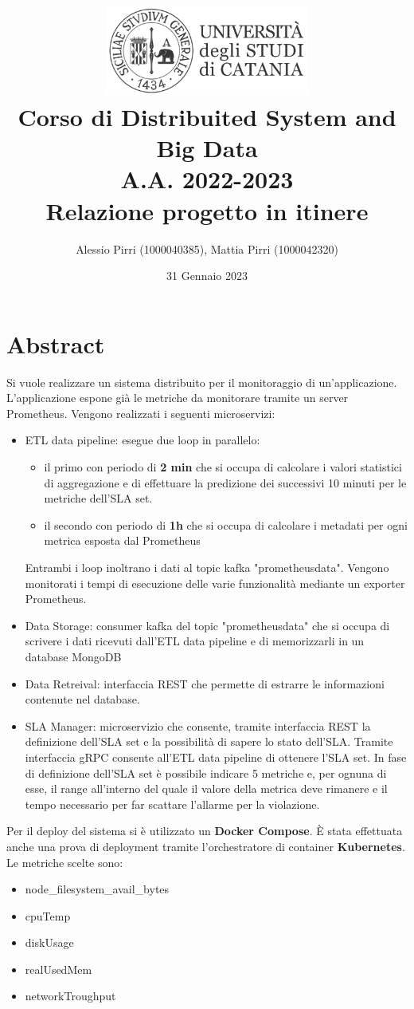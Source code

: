 \documentclass{article}
\title{
    \includegraphics[width=0.5\textwidth]{img/unict-universita-di-catania.png}\\
    \bigskip
    \LARGE Corso di Distribuited System and Big Data\\
    A.A. 2022-2023\\
    \Huge Relazione progetto in itinere\\
    \bigskip
    \Large 
}
\author{Alessio Pirri (1000040385), Mattia Pirri (1000042320)}
\date{31 Gennaio 2023}
\begin{document}
\maketitle
\newpage
\tableofcontents
\newpage

\section{Abstract}
Si vuole realizzare un sistema distribuito per il monitoraggio di un'applicazione. L'applicazione espone già le metriche da monitorare tramite un server Prometheus. Vengono realizzati i seguenti microservizi: 
\begin{itemize}
    \item ETL data pipeline: esegue due loop in parallelo: 
        \begin{itemize}
            
            \item il primo con periodo di \textbf{2 min} che si occupa di calcolare i valori statistici di aggregazione e di effettuare la predizione dei successivi 10 minuti per le metriche dell'SLA set.
            \item il secondo con periodo di \textbf{1h} che si occupa di calcolare i metadati per ogni metrica esposta dal Prometheus
        \end{itemize}
        Entrambi i loop inoltrano i dati al topic kafka "prometheusdata". Vengono monitorati i tempi di esecuzione delle varie funzionalità mediante un exporter Prometheus.
    \item Data Storage: consumer kafka del topic "prometheusdata" che si occupa di scrivere i dati ricevuti dall'ETL data pipeline e di memorizzarli in un database MongoDB
    \item Data Retreival: interfaccia REST che permette di estrarre le informazioni contenute nel database.
    \item SLA Manager: microservizio che consente, tramite interfaccia REST la definizione dell'SLA set e la possibilità di sapere lo stato dell'SLA. Tramite interfaccia gRPC consente all'ETL data pipeline di ottenere l'SLA set. In fase di definizione dell'SLA set è possibile indicare 5 metriche e, per ognuna di esse, il range all'interno del quale il valore della metrica deve rimanere e il tempo necessario per far scattare l'allarme per la violazione.
\end{itemize}
Per il deploy del sistema si è utilizzato un \textbf{Docker Compose}. È stata effettuata anche una prova di deployment tramite l'orchestratore di container \textbf{Kubernetes}.
Le metriche scelte sono:
\begin{itemize}
    \item node\_filesystem\_avail\_bytes
    \item cpuTemp
    \item diskUsage
    \item realUsedMem
    \item networkTroughput
\end{itemize}
 \newpage
\end{document}
